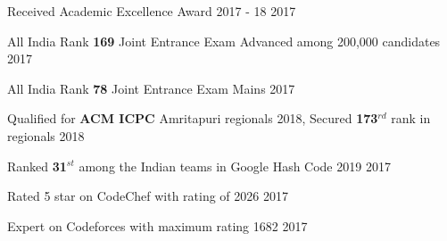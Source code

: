 \begin{cvhonorsa}
{\Large
  

  \cvhonora
  {Received Academic Excellence Award}
  {2017 - 18}
  {}
  {2017}
  
  \cvhonora
  {All India Rank \textbf{169}}
  {Joint Entrance Exam Advanced among 200,000 candidates}
  {}
  {2017}

  \cvhonora
  {All India Rank \textbf{78}}
  {Joint Entrance Exam Mains}
  {}
  {2017}
}

\end{cvhonorsa}
\begin{cvhonors}
{\Large
  \cvhonor
  {Qualified for \textbf{ACM ICPC} Amritapuri regionals 2018, Secured \textbf{173$^{rd}$} rank in regionals}
  {}
  {2018}
  
  \cvhonor
  {Ranked \textbf{31$^{st}$} among the Indian teams in Google Hash Code 2019}
  {}
  {2017}

  \cvhonor
  {Rated 5 star on CodeChef with rating of 2026}
  {}
  {2017}
  
  \cvhonor
  {Expert on Codeforces with maximum rating 1682}
  {}
  {2017}

}
\end{cvhonors}
